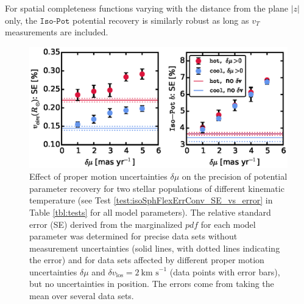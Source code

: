 \documentclass[iop,revtex4,numberedappendix,appendixfloats]{emulateapj}
\newcommand{\pdf}{\ensuremath{pdf}}
\begin{document}
For spatial completeness functions varying with the distance from the plane $|z|$ only, the $\texttt{Iso-Pot}$ potential recovery is similarly robust as long as $v_T$ measurements are included.

\begin{figure}[!htbp]
\centering
\includegraphics[width=\columnwidth]{isoSphFlexErrConv_SE_vs_error.eps}
\caption{Effect of proper motion uncertainties $\delta \mu$ on the precision of potential parameter recovery for two stellar populations of different kinematic temperature (see Test \ref{test:isoSphFlexErrConv_SE_vs_error} in Table \ref{tbl:tests} for all model parameters). The relative standard error (SE) derived from the marginalized \pdf{} for each model parameter was determined for precise data sets without measurement uncertainties (solid lines, with dotted lines indicating the error) and for data sets affected by different proper motion uncertainties $\delta \mu$ and $\delta v_\text{los}=2~\text{km s}^{-1}$ (data points with error bars), but no uncertainties in position. The errors come from taking the mean over several data sets.}
\label{fig:isoSphFlexErrConv_SE_vs_error}
\end{figure}
\end{document}

